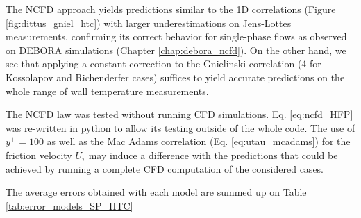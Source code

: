 \npar
The NCFD approach yields predictions similar to the 1D correlations (Figure \ref{fig:dittus_gniel_htc}) with larger underestimations on Jens-Lottes measurements, confirming its correct behavior for single-phase flows as observed on DEBORA simulations (Chapter \ref{chap:debora_ncfd}). On the other hand, we see that applying a constant correction to the Gnielinski correlation (4 for Kossolapov and Richenderfer cases) suffices to yield accurate predictions on the whole range of wall temperature measurements. 

\begin{remark*}{}
The NCFD law was tested without running CFD simulations. Eq. \ref{eq:ncfd_HFP} was re-written in python to allow its testing outside of the whole code. The use of $y^{+}=100$ as well as the Mac Adams correlation (Eq. \ref{eq:utau_mcadams}) for the friction velocity $U_{\tau}$ may induce a difference with the predictions that could be achieved by running a complete CFD computation of the considered cases.
\end{remark*}

\npar
The average errors obtained with each model are summed up on Table \ref{tab:error_models_SP_HTC}

\begin{table}[h!]


\noindent{}
\caption{Average errors achieved by the considered models on each data sets.}
\label{tab:error_models_SP_HTC}
\end{table}


